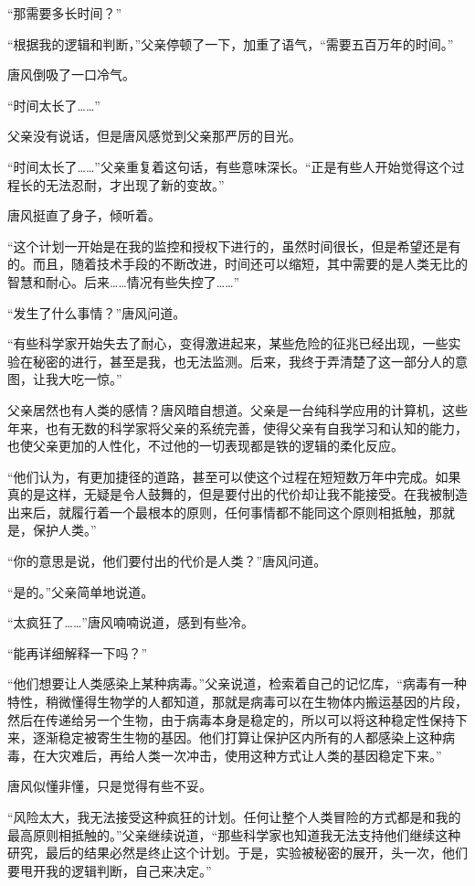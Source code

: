 “那需要多长时间？”

“根据我的逻辑和判断，”父亲停顿了一下，加重了语气，“需要五百万年的时间。”

唐风倒吸了一口冷气。

“时间太长了……”

父亲没有说话，但是唐风感觉到父亲那严厉的目光。

“时间太长了……”父亲重复着这句话，有些意味深长。“正是有些人开始觉得这个过程长的无法忍耐，才出现了新的变故。”

唐风挺直了身子，倾听着。

“这个计划一开始是在我的监控和授权下进行的，虽然时间很长，但是希望还是有的。而且，随着技术手段的不断改进，时间还可以缩短，其中需要的是人类无比的智慧和耐心。后来……情况有些失控了……”

“发生了什么事情？”唐风问道。

“有些科学家开始失去了耐心，变得激进起来，某些危险的征兆已经出现，一些实验在秘密的进行，甚至是我，也无法监测。后来，我终于弄清楚了这一部分人的意图，让我大吃一惊。”

父亲居然也有人类的感情？唐风暗自想道。父亲是一台纯科学应用的计算机，这些年来，也有无数的科学家将父亲的系统完善，使得父亲有自我学习和认知的能力，也使父亲更加的人性化，不过他的一切表现都是铁的逻辑的柔化反应。

“他们认为，有更加捷径的道路，甚至可以使这个过程在短短数万年中完成。如果真的是这样，无疑是令人鼓舞的，但是要付出的代价却让我不能接受。在我被制造出来后，就履行着一个最根本的原则，任何事情都不能同这个原则相抵触，那就是，保护人类。”

“你的意思是说，他们要付出的代价是人类？”唐风问道。

“是的。”父亲简单地说道。

“太疯狂了……”唐风喃喃说道，感到有些冷。

“能再详细解释一下吗？”

“他们想要让人类感染上某种病毒。”父亲说道，检索着自己的记忆库，“病毒有一种特性，稍微懂得生物学的人都知道，那就是病毒可以在生物体内搬运基因的片段，然后在传递给另一个生物，由于病毒本身是稳定的，所以可以将这种稳定性保持下来，逐渐稳定被寄生生物的基因。他们打算让保护区内所有的人都感染上这种病毒，在大灾难后，再给人类一次冲击，使用这种方式让人类的基因稳定下来。”

唐风似懂非懂，只是觉得有些不妥。

“风险太大，我无法接受这种疯狂的计划。任何让整个人类冒险的方式都是和我的最高原则相抵触的。”父亲继续说道，“那些科学家也知道我无法支持他们继续这种研究，最后的结果必然是终止这个计划。于是，实验被秘密的展开，头一次，他们要甩开我的逻辑判断，自己来决定。”

